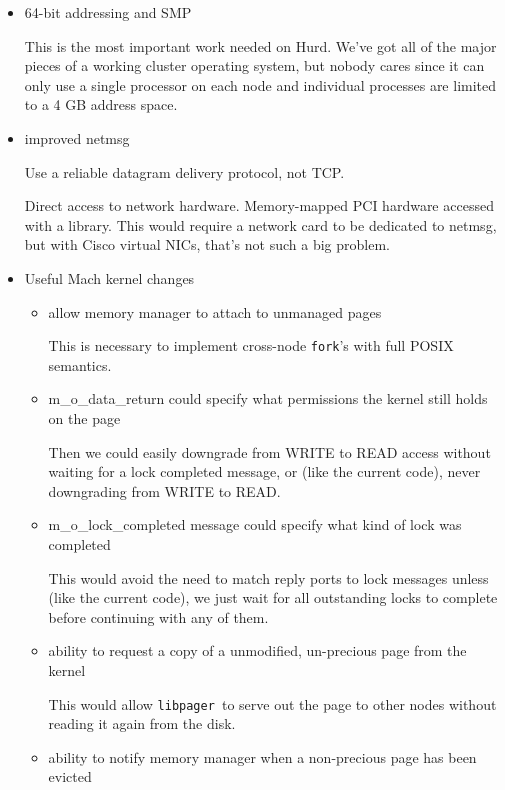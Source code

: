 \documentclass{article}
\def\libpager{{\tt libpager\ }}
\begin{document}
\begin{itemize}

\item 64-bit addressing and SMP

This is the most important work needed on Hurd.  We've got all of the
major pieces of a working cluster operating system, but nobody cares
since it can only use a single processor on each node and individual
processes are limited to a 4 GB address space.

\item improved netmsg

Use a reliable datagram delivery protocol, not TCP.

Direct access to network hardware.  Memory-mapped PCI hardware
accessed with a library.  This would require a network card
to be dedicated to netmsg, but with Cisco virtual NICs, that's
not such a big problem.

\item Useful Mach kernel changes

\begin{itemize}

\item allow memory manager to attach to unmanaged pages

  This is necessary to implement cross-node {\tt fork}'s with full POSIX semantics.

\item m_o_data_return could specify what permissions the kernel still holds on the page

  Then we could easily downgrade from WRITE to READ access without
  waiting for a lock completed message, or (like the current code),
  never downgrading from WRITE to READ.

\item m_o_lock_completed message could specify what kind of lock was completed

  This would avoid the need to match reply ports to lock messages
  unless (like the current code), we just wait for all outstanding
  locks to complete before continuing with any of them.

\item ability to request a copy of a unmodified, un-precious page from the kernel

  This would allow \libpager to serve out the page to other nodes without reading it again from the disk.

\item ability to notify memory manager when a non-precious page has been evicted


\end{itemize}
\end{itemize}
\end{document}
